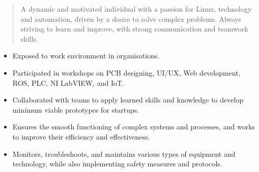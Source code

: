 \documentclass[10pt,a4paper,ragged2e,withhyper]{altacv}
\begin{document}
\begin{paracol}{2}
        
        
        \newpage
        
        \switchcolumn
        
            \begin{quote}
                A dynamic and motivated individual with a passion for Linux, technology and automation, driven by a desire to solve complex problems. Always striving to learn and improve, with strong communication and teamwork skills.
            \end{quote}
        
            \begin{itemize}
                \item Exposed to work environment in organisations. 
                \item Participated in workshops on PCB designing, UI/UX, Web development, ROS, PLC, NI LabVIEW, and IoT. 
                \item Collaborated with teams to apply learned skills and knowledge to develop minimum viable prototypes for startups.
            \end{itemize}
            \divider
            
            \begin{itemize}
                \item Ensures the smooth functioning of complex systems and processes, and works to improve their efficiency and effectiveness.
                \item     Monitors, troubleshoots, and maintains various types of equipment and technology, while also implementing safety measures and protocols.



\end{itemize}
\end{paracol}
\end{document}
